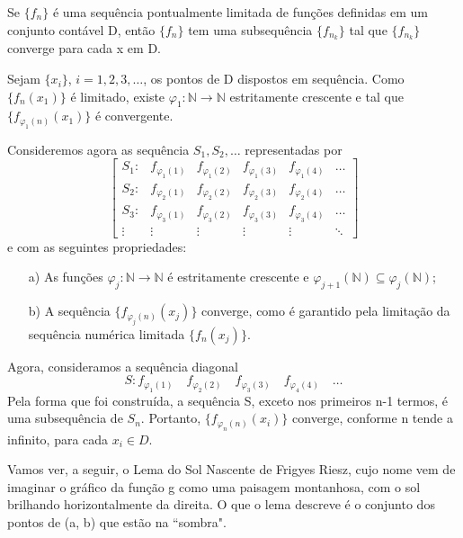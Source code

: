 \documentclass[../analysis_notes.tex]{subfiles}
\begin{document}
\begin{theorem*}
	Se \(\{f_{n}\}\) é uma sequência pontualmente limitada de funções definidas em um conjunto contável D, então \(\{f_{n}\}\) tem uma subsequência \(\{f_{n_{k}}\}\) tal que \(\{f_{n_{k}}\}\) converge para cada x em D.
\end{theorem*}
\begin{proof*}
	Sejam \(\{x_{i}\}\), \(i=1,2,3,\dotsc \), os pontos de D dispostos em sequência. Como \(\{f_{n}(x_{1})\}\) é limitado, existe \(\varphi_{1}:\mathbb{N}\rightarrow \mathbb{N}\) estritamente crescente e tal que \(\{f_{\varphi_{1}(n)}(x_{1})\}\) é convergente.

	Consideremos agora as sequência \(S_{1}, S_{2}, \dotsc \) representadas por
	\[
		\begin{bmatrix}
			S_{1}: & f_{\varphi_{1}(1)} & f_{\varphi_{1}(2)} & f_{\varphi_{1}(3)} & f_{\varphi_{1}(4)} & \dotsc \\
			S_{2}: & f_{\varphi_{2}(1)} & f_{\varphi_{2}(2)} & f_{\varphi_{2}(3)} & f_{\varphi_{2}(4)} & \dotsc \\
			S_{3}: & f_{\varphi_{3}(1)} & f_{\varphi_{3}(2)} & f_{\varphi_{3}(3)} & f_{\varphi_{3}(4)} & \dotsc \\
			\vdots & \vdots             & \vdots             & \vdots             & \vdots             & \ddots
		\end{bmatrix}
	\]
	e com as seguintes propriedades:
	\begin{itemize}
		\item[a)] As funções \(\varphi_{j}:\mathbb{N}\rightarrow \mathbb{N}\) é estritamente crescente e \(\varphi_{j+1}(\mathbb{N})\subseteq \varphi_{j}(\mathbb{N})\);
		\item[b)] A sequência \(\biggl\{f_{\varphi_{j}(n)}(x_{j})\biggr\}\) converge, como é garantido pela limitação da sequência numérica limitada \(\{f_{n}(x_{j})\}\).
	\end{itemize}
	Agora, consideramos a sequência diagonal
	\[
		S: f_{\varphi_{1}(1)} \quad  f_{\varphi_{2}(2)} \quad  f_{\varphi_{3}(3)} \quad f_{\varphi_{4}(4)} \quad  \dotsc
	\]
	Pela forma que foi construída, a sequência S, exceto nos primeiros n-1 termos, é uma subsequência de \(S_{n}.\) Portanto, \(\{f_{\varphi_{n}(n)}(x_{i})\}\) converge, conforme n tende a infinito, para cada \(x_{i}\in D\). \qedsymbol
\end{proof*}
Vamos ver, a seguir, o Lema do Sol Nascente de Frigyes Riesz, cujo nome vem de imaginar o gráfico da função g como uma paisagem montanhosa, com o sol brilhando horizontalmente da direita. O que o lema descreve é o conjunto dos pontos de (a, b) que estão na ``sombra".
\end{document}
